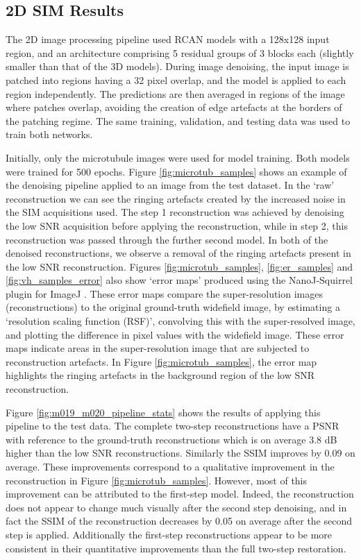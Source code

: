 \documentclass[12pt]{article}
\begin{document}
\subsection{2D SIM Results}

The 2D image processing pipeline used RCAN models with a 128x128 input region,
and an architecture comprising 5 residual groups of 3 blocks each (slightly smaller than that of the 3D models).
During image denoising, the input image is patched into regions having a 32 pixel overlap,
and the model is applied to each region independently.
The predictions are then averaged in regions of the image where patches overlap,
avoiding the creation of edge artefacts at the borders of the patching regime.
The same training, validation, and testing data was used to train both networks.

Initially, only the microtubule images were used for model training.
Both models were trained for 500 epochs.
Figure \ref{fig:microtub_samples} shows an example of the denoising pipeline applied to an image from the test dataset.
In the `raw' reconstruction we can see the ringing artefacts created by the increased noise in the SIM acquisitions used.
The step 1 reconstruction was achieved by denoising the low SNR acquisition before applying the reconstruction,
while in step 2, this reconstruction was passed through the further second model.
In both of the denoised reconstructions, we observe a removal of the ringing artefacts present in the low SNR reconstruction.
Figures \ref{fig:microtub_samples}, \ref{fig:er_samples} and \ref{fig:vh_samples_error} also show `error maps' produced using the NanoJ-Squirrel plugin for ImageJ \cite{squirrel}.
These error maps compare the super-resolution images (reconstructions) to the original ground-truth widefield image,
by estimating a `resolution scaling function (RSF)', convolving this with the super-resolved image,
and plotting the difference in pixel values with the widefield image.
These error maps indicate areas in the super-resolution image that are subjected to reconstruction artefacts.
In Figure \ref{fig:microtub_samples}, the error map highlights the ringing artefacts in the background region of the low SNR reconstruction.

Figure \ref{fig:m019_m020_pipeline_stats} shows the results of applying this pipeline to the test data.
The complete two-step reconstructions have a PSNR with reference to the ground-truth reconstructions which is on average 3.8 dB higher than the low SNR reconstructions.
Similarly the SSIM improves by 0.09 on average.
These improvements correspond to a qualitative improvement in the reconstruction in Figure \ref{fig:microtub_samples}.
However, most of this improvement can be attributed to the first-step model.
Indeed, the reconstruction does not appear to change much visually after the second step denoising,
and in fact the SSIM of the reconstruction decreases by 0.05 on average after the second step is applied.
Additionally the first-step reconstructions appear to be more consistent in their quantitative improvements than the full two-step restoration.
\end{document}
